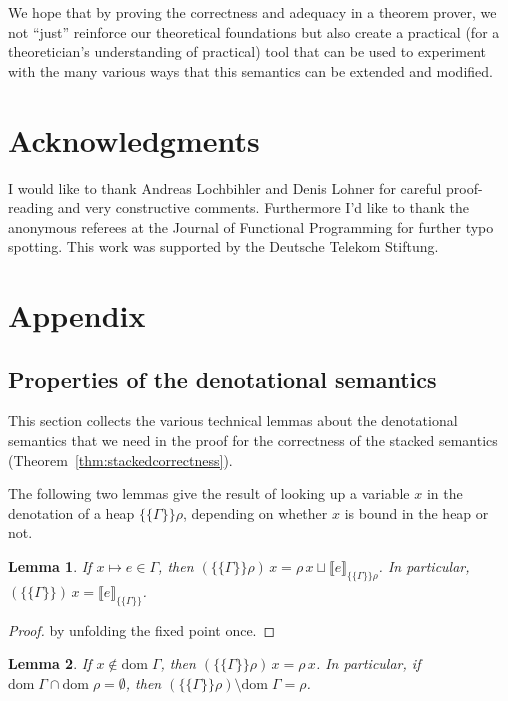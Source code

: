 \documentclass[twopage]{scrartcl}
\newtheorem{lemma}{Lemma}
\theoremstyle{nonumberbreak}
\newtheorem{proof}{Proof}
\newcommand{\dom}[1]{\text{dom}\;#1}
\newcommand{\dsem}[2]{\llbracket #1 \rrbracket_{#2}}
\newcommand{\esem}[1]{\{\!\!\!\{#1\}\!\!\!\}}
\begin{document}
We hope that by proving the correctness and adequacy in a theorem prover, we not “just” reinforce our theoretical foundations but also create a practical (for a theoretician’s understanding of practical) tool that can be used to experiment with the many various ways that this semantics can be extended and modified.

\section*{Acknowledgments}

I would like to thank Andreas Lochbihler and Denis Lohner for careful proof-reading and very constructive comments. Furthermore I'd like to thank the anonymous referees at the Journal of Functional Programming for further typo spotting. This work was supported by the Deutsche Telekom Stiftung.




\appendix


\section{Appendix}
\subsection{Properties of the denotational semantics}
\label{sec:denprops}

This section collects the various technical lemmas about the denotational semantics that we need in the proof for the correctness of the stacked semantics (Theorem~\ref{thm:stackedcorrectness}).

The following two lemmas give the result of looking up a variable $x$ in the denotation of a heap $\esem\Gamma\rho$, depending on whether $x$ is bound in the heap or not. 

\begin{lemma}
\label{lem:esem_this}
If $x \mapsto e \in \Gamma$, then $(\esem{\Gamma}\rho)\, x = \rho\, x \sqcup \dsem{e}{\esem{\Gamma}\rho}$. In particular, $(\esem{\Gamma})\, x = \dsem{e}{\esem{\Gamma}}$.
\end{lemma}

\begin{proof}
by unfolding the fixed point once.
\end{proof}

\begin{lemma}
\label{lem:esem_other}%
\label{lem:remove}
If $x \notin \dom \Gamma$, then $(\esem{\Gamma}\rho)\, x = \rho\, x$.
In particular, if $\dom \Gamma \cap \dom \rho = \emptyset$, then $(\esem{\Gamma}\rho) \setminus \dom\Gamma = \rho$.
\end{lemma}
\end{document}
